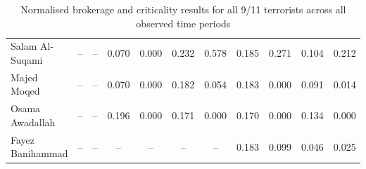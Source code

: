 \begin{subappendices}
\begin{table}
\begin{center}
\begin{tabular}{l cc cccccccc}
Salam Al-Suqami       	& --      & --      & 0.070   & 0.000   & 0.232   & 0.578   & 0.185   & 0.271   & 0.104   & 0.212   \\
Majed Moqed           	& --      & --      & 0.070   & 0.000   & 0.182   & 0.054   & 0.183   & 0.000   & 0.091   & 0.014   \\
Osama Awadallah       	& --      & --      & 0.196   & 0.000   & 0.171   & 0.000   & 0.170   & 0.000   & 0.134   & 0.000   \\
Fayez Banihammad      	& --      & --      & --      & --      & --      & --      & 0.183   & 0.099   & 0.046   & 0.025   \\
\bottomrule
\end{tabular}
\end{center}
\caption{Normalised brokerage and criticality results for all 9/11 terrorists across all observed time periods}
\label{allterrorists}
\end{table}

\end{subappendices}